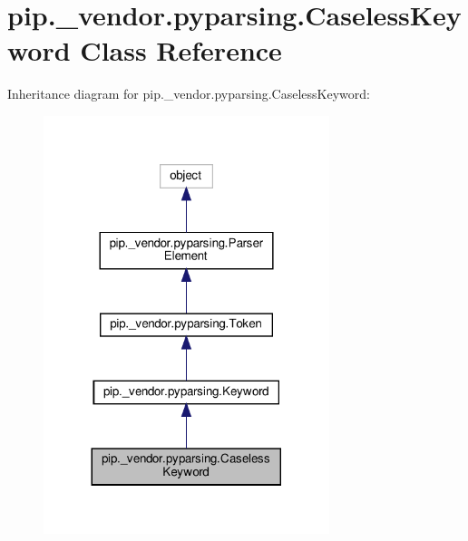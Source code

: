 \hypertarget{classpip_1_1__vendor_1_1pyparsing_1_1CaselessKeyword}{}\section{pip.\+\_\+vendor.\+pyparsing.\+Caseless\+Keyword Class Reference}
\label{classpip_1_1__vendor_1_1pyparsing_1_1CaselessKeyword}


Inheritance diagram for pip.\+\_\+vendor.\+pyparsing.\+Caseless\+Keyword\+:
\nopagebreak
\begin{figure}[H]
\begin{center}
\leavevmode
\includegraphics[width=236pt]{classpip_1_1__vendor_1_1pyparsing_1_1CaselessKeyword__inherit__graph}
\end{center}
\end{figure}



